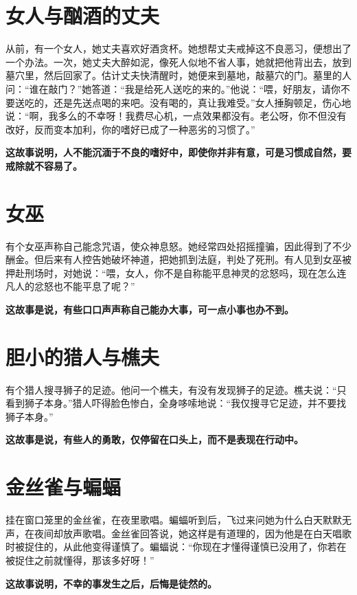 \section{女人与酗酒的丈夫}

从前，有一个女人，她丈夫喜欢好酒贪杯。她想帮丈夫戒掉这不良恶习，便想出了一个办法。一次，她丈夫大醉如泥，像死人似地不省人事，她就把他背出去，放到墓穴里，然后回家了。估计丈夫快清醒时，她便来到墓地，敲墓穴的门。墓里的人问：“谁在敲门？”她答道：“我是给死人送吃的来的。”他说：“喂，好朋友，请你不要送吃的，还是先送点喝的来吧。没有喝的，真让我难受。”女人捶胸顿足，伤心地说：“啊，我多么的不幸呀！我费尽心机，一点效果都没有。老公呀，你不但没有改好，反而变本加利，你的嗜好已成了一种恶劣的习惯了。”

{\bfseries \color{red}这故事说明，人不能沉湎于不良的嗜好中，即使你并非有意，可是习惯成自然，要戒除就不容易了。}

\section{女巫}

有个女巫声称自己能念咒语，使众神息怒。她经常四处招摇撞骗，因此得到了不少酬金。但后来有人控告她破坏神道，把她抓到法庭，判处了死刑。有人见到女巫被押赴刑场时，对她说：“喂，女人，你不是自称能平息神灵的忿怒吗，现在怎么连凡人的忿怒也不能平息了呢？”

{\bfseries \color{red}这故事是说，有些口口声声称自己能办大事，可一点小事也办不到。}

\section{胆小的猎人与樵夫}

有个猎人搜寻狮子的足迹。他问一个樵夫，有没有发现狮子的足迹。樵夫说：“只看到狮子本身。”猎人吓得脸色惨白，全身哆嗦地说：“我仅搜寻它足迹，并不要找狮子本身。”

{\bfseries \color{red}这故事是说，有些人的勇敢，仅停留在口头上，而不是表现在行动中。}

\section{金丝雀与蝙蝠}

挂在窗口笼里的金丝雀，在夜里歌唱。蝙蝠听到后，飞过来问她为什么白天默默无声，在夜间却放声歌唱。金丝雀回答说，她这样是有道理的，因为他是在白天唱歌时被捉住的，从此他变得谨慎了。蝙蝠说：“你现在才懂得谨慎已没用了，你若在被捉住之前就懂得，那该多好呀！”

{\bfseries \color{red}这故事说明，不幸的事发生之后，后悔是徒然的。}

